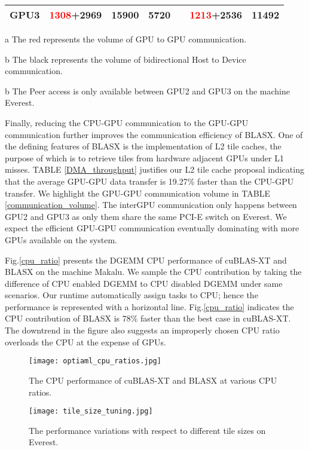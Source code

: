 \documentclass[conference]{IEEEtran}
\begin{document}
\begin{table}[t]
\begin{tabular}{c c c c c c c}
    \textbf{GPU3}  & \textcolor{red}{1308}+2969 &    15900   &    5720  & &   \textcolor{red}{1213}+2536 &  11492      \\
    \bottomrule
\end{tabular}
\begin{tablenotes}
            \item[a] \mbox{\textdagger }  The red represents the volume of GPU to GPU communication.
            \item[b] \mbox{\textdaggerdbl } The black represents the volume of bidirectional Host to Device communication.
            \item[b] \mbox{\textbullet } The Peer access is only available between GPU2 and GPU3 on the machine Everest.
\end{tablenotes}
\vspace{-0.1in}
\end{table}

Finally, reducing the CPU-GPU communication to the GPU-GPU communication further improves 
the communication efficiency of BLASX. One of the defining features of BLASX is the implementation of L2 tile 
caches, the purpose of which is to retrieve tiles from hardware adjacent GPUs under L1 misses. 
TABLE \ref{DMA_throughput} justifies our L2 tile cache 
proposal indicating that the average GPU-GPU data transfer is 19.27\% faster than the CPU-GPU 
transfer. We highlight the GPU-GPU communication volume in TABLE \ref{communication_volume}.
The interGPU communication only happens between GPU2 and GPU3 as only them share the same PCI-E switch
on Everest. We expect the efficient GPU-GPU communication eventually dominating 
with more GPUs available on the system.

Fig.\ref{cpu_ratio} presents the DGEMM CPU performance of cuBLAS-XT and BLASX on the machine Makalu.
We sample the CPU contribution by taking the difference of CPU enabled DGEMM to CPU disabled DGEMM 
under same scenarios. Our runtime automatically assign tasks to CPU; hence the performance is represented 
with a horizontal line. Fig.\ref{cpu_ratio} indicates the CPU contribution of BLASX is 78\% faster than 
the best case in cuBLAS-XT. The downtrend in the figure also suggests an improperly chosen CPU ratio 
overloads the CPU at the expense of GPUs.


\begin{figure}[t]
\centering
\texttt{[image: optiaml\_cpu\_ratios.jpg]}
\caption{The CPU performance of cuBLAS-XT and BLASX at various CPU ratios.}
\label{cpu_ratio}
\centering
\texttt{[image: tile\_size\_tuning.jpg]}
\caption{The performance variations with respect to different tile sizes on Everest.}
\label{tile_size_tuning}
\vspace{-0.3in}
\end{figure}
\end{document}
